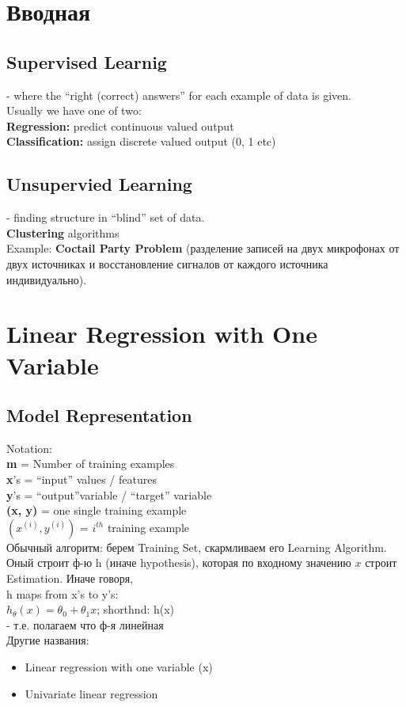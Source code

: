\documentclass{scrartcl}
\begin{document}
\section {Вводная}
\subsection* {Supervised Learnig} - where the ``right (correct) answers'' for
  each example of data is given. \\
Usually we have one of two:\\
{\bf Regression:} predict continuous valued output \\
{\bf Classification:} assign discrete valued output (0, 1 etc) \\

\subsection* {Unsupervied Learning} - finding structure in ``blind'' set of
  data. \\
{\bf Clustering} algorithms  \\
Example: {\bf Coctail Party Problem} (разделение записей на двух микрофонах
от двух источниках и восстановление сигналов от каждого источника
индивидуально). \\

\section {Linear Regression with One Variable}

\subsection {Model Representation}
Notation: \\
{\bf m} =  Number of training examples \\
{\bf x}'s = ``input'' values / features \\
{\bf y}'s = ``output''variable / ``target'' variable \\
{\bf (x, y)} = one single training example \\
{\bf $(x^{(i)}, y^{(i)})$} = $i^{th}$ training example \\

Обычный алгоритм: берем Training Set, скармливаем его Learning
Algorithm. Оный строит ф-ю h (иначе hypothesis), которая по входному
значению $x$ строит Estimation. Иначе говоря, \\
h maps from x's to y's: \\
$h_\theta(x)=\theta_0 + \theta_1x$; shorthnd: h(x) \\
- т.е. полагаем что ф-я линейная \\
Другие названия:
\begin{itemize}
\item Linear regression with one variable (x)
\item Univariate linear regression
\end{itemize}
\end{document}
